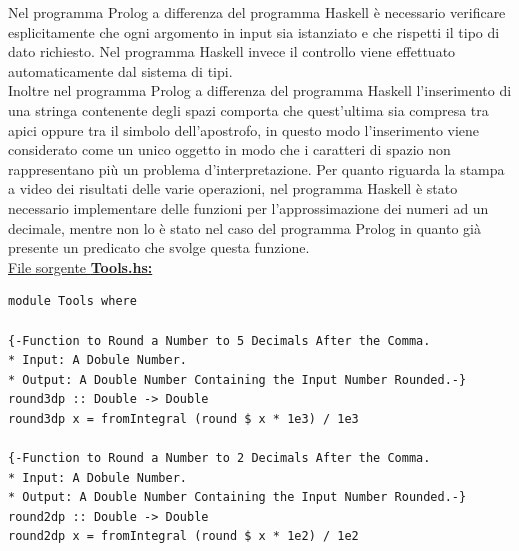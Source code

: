 \documentclass{article}
\begin{document}
Nel programma Prolog a differenza del programma Haskell è necessario verificare esplicitamente che ogni argomento in input sia istanziato e che rispetti il tipo di dato richiesto. Nel programma Haskell invece il controllo viene effettuato automaticamente dal sistema di tipi.\\
Inoltre nel programma Prolog a differenza del programma Haskell l'inserimento di una stringa contenente degli spazi comporta che quest'ultima sia compresa tra apici oppure tra il simbolo dell'apostrofo, in questo modo l'inserimento viene considerato come un unico oggetto in modo che i caratteri di spazio non rappresentano più un problema d'interpretazione.
Per quanto riguarda la stampa a video dei risultati delle varie operazioni, nel programma Haskell è stato necessario implementare delle funzioni per l'approssimazione dei numeri ad un decimale, mentre non lo è stato nel caso del programma Prolog in quanto già presente un predicato che svolge questa funzione.\\
\bigskip
\underline{File sorgente \textbf{Tools.hs:}}
\lstset{language=Haskell}
\begin{lstlisting}
module Tools where

{-Function to Round a Number to 5 Decimals After the Comma.
* Input: A Dobule Number.
* Output: A Double Number Containing the Input Number Rounded.-}
round3dp :: Double -> Double
round3dp x = fromIntegral (round $ x * 1e3) / 1e3

{-Function to Round a Number to 2 Decimals After the Comma.
* Input: A Dobule Number.
* Output: A Double Number Containing the Input Number Rounded.-}
round2dp :: Double -> Double
round2dp x = fromIntegral (round $ x * 1e2) / 1e2
\end{lstlisting}
\end{document}
